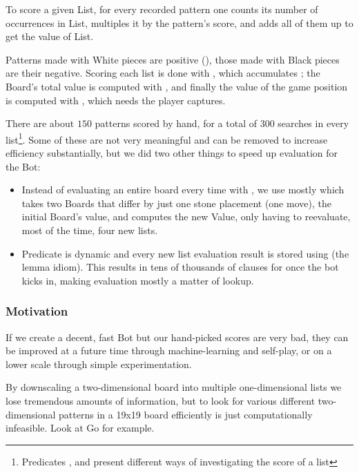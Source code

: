 \documentclass[12pt,a4paper,notitlepage]{article}
\begin{document}
To score a given List, for every recorded pattern one counts its number of occurrences in List, multiples it by the pattern's score, and adds all of them up to get the value of List.

Patterns made with White pieces are positive (), those made with Black pieces are their negative. Scoring each list is done with , which accumulates ; the Board's total value is computed with , and finally the value of the game position is computed with , which needs the player captures.

There are about $150$ patterns scored by hand, for a total of $300$  searches in every list\footnote{Predicates ,  and  present different ways of investigating the score of a list}. Some of these are not very meaningful and can be removed to increase efficiency substantially, but we did two other things to speed up evaluation for the Bot:

\begin{itemize}
	\item Instead of evaluating an entire board every time with , we use mostly  which takes two Boards that differ by just one stone placement (one move), the initial Board's value, and computes the new Value, only having to reevaluate, most of the time, four new lists.
	\item Predicate  is dynamic and every new list evaluation result is stored using  (the lemma idiom). This results in tens of thousands of clauses for  once the bot kicks in, making evaluation mostly a matter of lookup.
\end{itemize}

\subsubsection{Motivation}
\label{subsubsec:motivation}

If we create a decent, fast Bot but our hand-picked scores are very bad, they can be improved at a future time through machine-learning and self-play, or on a lower scale through simple experimentation.

By downscaling a two-dimensional board into multiple one-dimensional lists we lose tremendous amounts of information, but to look for various different two-dimensional patterns in a 19x19 board efficiently is just computationally infeasible. Look at Go for example.
\end{document}

